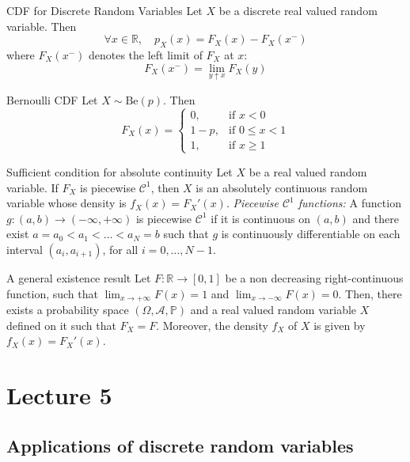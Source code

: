 \documentclass[11pt, a4paper]{article}
\begin{document}
\begin{proposition}{CDF for Discrete Random Variables}{}
Let $X$ be a discrete real valued random variable. Then
\[ \forall x \in \mathbb{R}, \quad p_X(x) = F_X(x) - F_X(x^-) \]
where $F_X(x^-)$ denotes the left limit of $F_X$ at $x$:
\[ F_X(x^-) = \lim_{y \uparrow x} F_X(y) \]
\end{proposition}

\begin{example}{Bernoulli CDF}{}
Let $X \sim \text{Be}(p)$. Then
\[ F_X(x) = \begin{cases} 0, & \text{if } x < 0 \\ 1 - p, & \text{if } 0 \le x < 1 \\ 1, & \text{if } x \ge 1 \end{cases} \]
\end{example}

\begin{proposition}{Sufficient condition for absolute continuity}{}
Let $X$ be a real valued random variable. If $F_X$ is piecewise $\mathcal{C}^1$, then $X$ is an absolutely continuous random variable whose density is $f_X(x) = F_X'(x)$.
\textit{Piecewise $\mathcal{C}^1$ functions:} A function $g: (a, b) \to (-\infty, +\infty)$ is piecewise $\mathcal{C}^1$ if it is continuous on $(a, b)$ and there exist $a = a_0 < a_1 < \dots < a_N = b$ such that $g$ is continuously differentiable on each interval $(a_i, a_{i+1})$, for all $i = 0, \dots, N-1$.
\end{proposition}

\begin{theorem}{A general existence result}{}
Let $F: \mathbb{R} \to [0,1]$ be a non decreasing right-continuous function, such that $\lim_{x \to +\infty} F(x) = 1$ and $\lim_{x \to -\infty} F(x) = 0$. Then, there exists a probability space $(\Omega, \mathcal{A}, \mathbb{P})$ and a real valued random variable $X$ defined on it such that $F_X = F$. Moreover, the density $f_X$ of $X$ is given by $f_X(x) = F_X'(x)$.
\end{theorem}



\section{Lecture 5}

\subsection{Applications of discrete random variables}
\end{document}
